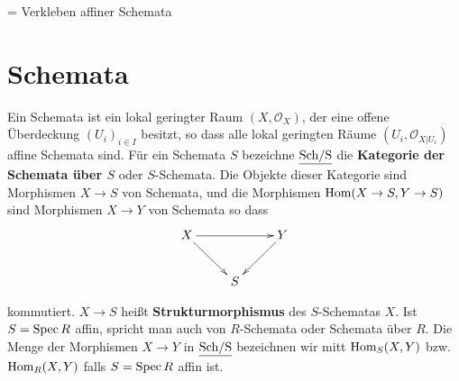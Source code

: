 = Verkleben affiner Schemata

\section{Schemata}
\begin{defn}
  Ein Schemata ist ein lokal geringter Raum $(X,\mathcal{O}_{X})$,
  der eine offene Überdeckung $(U_{i})_{i\in I}$ besitzt, so dass alle
  lokal geringten Räume $(U_{i},\mathcal{O}_{X|U_{i}})$ affine Schemata
  sind. Für ein Schemata $S$ bezeichne $\operatorname{\underline{Sch/S}}$ die \textbf{Kategorie
    der Schemata über $S$} oder $S$-Schemata. Die Objekte dieser Kategorie
  sind Morphismen $X\rightarrow S$ von Schemata, und die Morphismen
  $\operatorname{\mathrm{Hom}}(X\rightarrow S,Y\rightarrow S)$ sind Morphismen $X\rightarrow Y$
  von Schemata so dass
  \[
    \xymatrix{X\ar[rr]\ar[dr] &  & Y\ar[dl]\\
      & S
    }
  \]

  kommutiert. $X\rightarrow S$ heißt \textbf{Strukturmorphismus} des
  $S$-Schematas $X$. Ist $S=\operatorname{Spec} R$ affin, spricht man auch von
  $R$-Schemata oder Schemata über $R$. Die Menge der Morphismen $X\rightarrow Y$
  in $\operatorname{\underline{Sch/S}}$ bezeichnen wir mitt $\operatorname{\mathrm{Hom}}_{S}(X,Y)$ bzw. $\operatorname{\mathrm{Hom}}_{R}(X,Y)$
  falls $S=\operatorname{Spec} R$ affin ist.
\end{defn}
